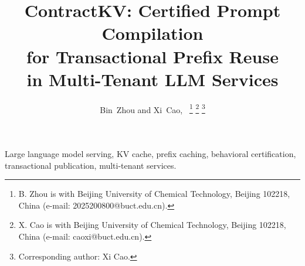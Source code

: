 \documentclass[journal]{IEEEtran}
\begin{document}
\title{ContractKV: Certified Prompt Compilation\\for Transactional Prefix Reuse\\in Multi-Tenant LLM Services}
\author{Bin~Zhou and Xi~Cao,~
\thanks{B. Zhou is with Beijing University of Chemical Technology, Beijing 102218, China (e-mail: 2025200800@buct.edu.cn).}
\thanks{X. Cao is with Beijing University of Chemical Technology, Beijing 102218, China (e-mail: caoxi@buct.edu.cn).}
\thanks{Corresponding author: Xi Cao.}}
\maketitle

\begin{IEEEkeywords}
Large language model serving, KV cache, prefix caching, behavioral certification, transactional publication, multi-tenant services.
\end{IEEEkeywords}










\end{document}
